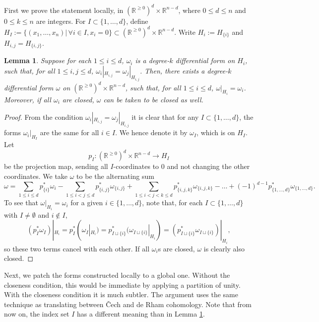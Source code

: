 \documentclass[11pt]{article}
\newtheorem{lmm}[thm]{Lemma}
\theoremstyle{definition}
\theoremstyle{remark}
\def\R{\mathbb{R}}
\begin{document}
\begin{appendices}
First we prove the statement locally, in $(\R^{\ge0})^d\times\R^{n-d}$, where $0\le d\le n$ and $0\le k\le n$ are integers. 
For $I\subset\{1,\ldots,d\}$, define $H_I:=\big\{(x_1,\ldots,x_n)\big|\,\forall i\in I, x_i=0\big\}\subset (\R^{\ge0})^d\times\R^{n-d}$. 
Write $H_i:=H_{\{i\}}$ and $H_{i,j}=H_{\{i,j\}}$. 
\begin{lmm}\label{localformpatching_lmm}
Suppose for each $1\le i\le d$, $\omega_i$ is a degree-$k$ differential form on $H_i$, such that, for all $1\le i,j\le d$, $\omega_i|_{H_{i,j}}=\omega_j|_{H_{i,j}}$. 
Then, there exists a degree-$k$ differential form $\omega$ on $(\R^{\ge0})^d\times\R^{n-d}$, such that, for all $1\le i\le d$, $\omega|_{H_i}=\omega_i$. 
Moreover, if all $\omega_i$ are closed, $\omega$ can be taken to be closed as well. 
\end{lmm}
\begin{proof}
From the condition $\omega_i|_{H_{i,j}}=\omega_j|_{H_{i,j}}$ it is clear that for any $I\subset\{1,\ldots,d\}$, the forms $\omega_i|_{H_I}$ are the same for all $i\in I$. We hence denote it by $\omega_I$, which is on $H_I$. %
Let $$p_I:(\R^{\ge0})^d\times\R^{n-d}\longrightarrow H_I$$
be the projection map, sending all $I$-coordinates to 0 and not changing the other coordinates. 
We take $\omega$ to be the alternating sum
$$
\omega=\sum_{1\le i\le d}p_{\{i\}}^*\omega_i
-\sum_{1\le i<j\le d}p_{\{i,j\}}^*\omega_{\{i,j\}}
+\sum_{1\le i<j<k\le d}p_{\{i,j,k\}}^*\omega_{\{i,j,k\}}
-\ldots+(-1)^{d-1}p_{\{1,\ldots,d\}}^*\omega_{\{1,\ldots,d\}}.
$$
To see that $\omega|_{H_i}=\omega_i$ for a given $i\in\{1,\ldots,d\}$, note that, for each $I\subset\{1,\ldots,d\}$ with $I\neq\emptyset$ and $i\notin I$,
$$(p_I^*\omega_I)|_{H_i}=p_I^*(\omega_I|_{H_i})=p_{I\sqcup\{i\}}^*(\omega_{I\sqcup\{i\}}|_{H_i})=(p_{I\sqcup\{i\}}^*\omega_{I\sqcup\{i\}})|_{H_i},$$ so these two terms cancel with each other. 
If all $\omega_i$s are closed, $\omega$ is clearly also closed. 
\end{proof}

Next, we patch the forms constructed locally to a global one. Without the closeness condition, this would be immediate by applying a partition of unity. With the closeness condition it is much subtler. 
The argument uses the same technique as translating between \v{C}ech and de Rham cohomology. 
Note that from now on, the index set $I$ has a different meaning than in Lemma \ref{localformpatching_lmm}. 


\end{appendices}
\end{document}
